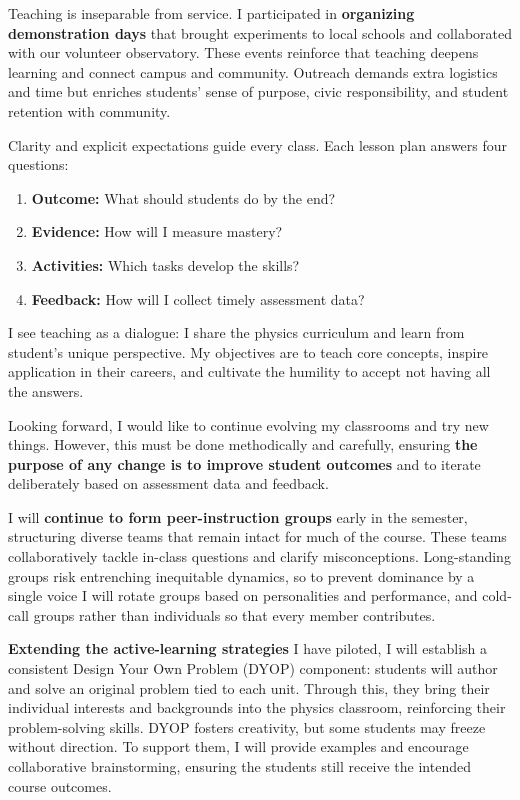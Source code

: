 \documentclass[11pt]{article}
\begin{document}
Teaching is inseparable from service. I participated in \textbf{organizing demonstration days} that brought experiments to local schools and collaborated with our volunteer observatory. These events reinforce that teaching deepens learning and connect campus and community. Outreach demands extra logistics and time but enriches students’ sense of purpose, civic responsibility, and student retention with community.

Clarity and explicit expectations guide every class. Each lesson plan answers four questions:
\begin{enumerate}[label=\arabic*.]
  \item \textbf{Outcome:} What should students do by the end?
  \item \textbf{Evidence:} How will I measure mastery?
  \item \textbf{Activities:} Which tasks develop the skills?
  \item \textbf{Feedback:} How will I collect timely assessment data?
\end{enumerate}

I see teaching as a dialogue: I share the physics curriculum and learn from student's unique perspective. My objectives are to teach core concepts, inspire application in their careers, and cultivate the humility to accept not having all the answers.

\pagebreak 
Looking forward, I would like to continue evolving my classrooms and try new things. However, this must be done methodically and carefully, ensuring \textbf{the purpose of any change is to improve student outcomes} and to iterate deliberately based on assessment data and feedback.

I will \textbf{continue to form peer-instruction groups} early in the semester, structuring diverse teams that remain intact for much of the course. These teams collaboratively tackle in-class questions and clarify misconceptions. Long-standing groups risk entrenching inequitable dynamics, so to prevent dominance by a single voice I will rotate groups based on personalities and performance, and cold-call groups rather than individuals so that every member contributes.

\textbf{Extending the active-learning strategies} I have piloted, I will establish a consistent {Design Your Own Problem (DYOP) component}: students will author and solve an original problem tied to each unit. Through this, they bring their individual interests and backgrounds into the physics classroom, reinforcing their problem-solving skills. DYOP fosters creativity, but some students may freeze without direction. To support them, I will provide examples and encourage collaborative brainstorming, ensuring the students still receive the intended course outcomes.
\end{document}
